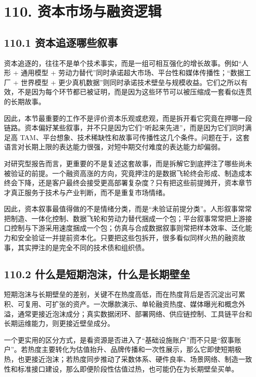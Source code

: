 \section*{110. 资本市场与融资逻辑}

\subsection*{110.1 资本追逐哪些叙事}


资本追逐的，往往不是单个技术事实，而是一组可相互强化的增长故事。例如“人形 + 通用模型 + 劳动力替代”同时承诺超大市场、平台性和媒体传播性；“数据工厂 + 世界模型 + 更少真机数据”则同时承诺技术壁垒与规模收益。它们之所以有效，不是因为每个环节都已被证明，而是因为这些环节可以被压缩成一套看似连贯的长期故事。

因此，本节最重要的工作不是评价资本乐观或悲观，而是拆开看它究竟在押哪一段链路。资本偏好某些叙事，并不只是因为它们“听起来先进”，而是因为它们同时满足高 TAM、平台想象、技术稀缺性和故事可传播性这几个条件。问题在于，这套语言对长期上限的表达能力很强，对短中期交付难度的表达能力却偏弱。

对研究型报告而言，更重要的不是复述这套故事，而是拆解它到底押注了哪些尚未被验证的前提。一个融资高涨的方向，究竟押注的是数据飞轮终会形成、制造成本终会下降，还是客户最终会接受更高部署复杂度？只有把这些前提摊开，资本章节才真正服务于技术与产业判断，而不是重复市场情绪。

因此，资本叙事最值得做的不是情绪分类，而是“未验证前提分类”。人形叙事常常把制造、一体化控制、数据飞轮和劳动力替代捆成一个包；平台叙事常常把上游接口控制与下游采用速度捆成一个包；仿真与合成数据叙事则常把样本效率、泛化能力和安全验证一并提前资本化。只要把这些包拆开，很多看似同样火热的融资故事，其实押注的是完全不同的技术债和组织债。

\subsection*{110.2 什么是短期泡沫，什么是长期壁垒}


短期泡沫与长期壁垒的差别，关键不在热度高低，而在热度背后是否沉淀出可累积、可复用、可扩张的资产。一次爆款演示、单轮融资热度、媒体曝光和概念外溢，通常更接近泡沫成分；真实数据闭环、部署网络、供应链控制、工具链平台和长期运维能力，则更接近壁垒成分。

一个更实用的区分方式，是看资源是否进入了“基础设施账户”而不只是“叙事账户”。若热度主要转化为估值抬升、品牌传播和一次性展示，那么它即使短期极热，也更接近泡沫；若热度同步推动了采数体系、硬件良率、场景网络、制造一致性和标准接口建设，那么即便阶段性估值过热，也可能仍在为长期壁垒买单。

